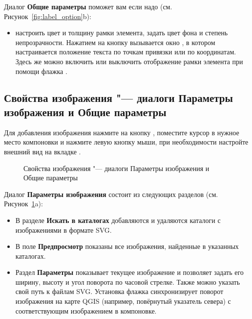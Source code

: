 
Диалог \textbf{Общие параметры} поможет вам если надо
(см. Рисунок~\ref{fig:label_option}b):

\begin{itemize}[label=--]
\item настроить цвет и толщину рамки элемента, задать
цвет фона и степень непрозрачности. Нажатием на кнопку 
вызывается окно , в котором настраивается
положение текста по точкам привязки или по координатам. Здесь же можно
включить или выключить отображение рамки элемента при помощи флажка
.
\end{itemize}

\subsection{Свойства изображения "--- диалоги Параметры изображения и Общие параметры}

Для добавления изображения нажмите на кнопку
, поместите
курсор в нужное место компоновки и нажмите левую кнопку мыши, при
необходимости настройте внешний вид на вкладке .

\begin{figure}[ht]
\centering
     \hspace{1cm}
   \caption{Свойства изображения "--- диалоги Параметры изображения и Общие параметры \wincaption}\label{fig:imageoptions}
\end{figure}


Диалог \textbf{Параметры изображения} состоит из следующих
разделов (см. Рисунок~\ref{fig:imageoptions}a):

\begin{itemize}[label=--]
\item В разделе \textbf{Искать в каталогах} добавляются и удаляются
каталоги с изображениями в формате SVG.
\item В поле \textbf{Предпросмотр} показаны все изображения, найденные
в указанных каталогах.
\item Раздел \textbf{Параметры} показывает текущее изображение и
позволяет задать его ширину, высоту и угол поворота по часовой стрелке.
Также можно указать свой путь к файлам SVG. Установка флажка
 синхронизирует поворот изображения
на карте QGIS (например, повёрнутый указатель севера) с соответствующим
изображением в компоновке.
\end{itemize}

